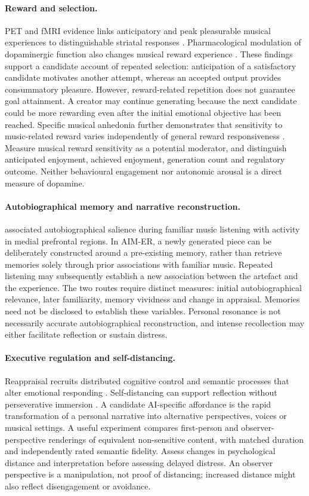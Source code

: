 \documentclass[11pt,a4paper]{article}
\begin{document}
\paragraph{Reward and selection.} PET and fMRI evidence links anticipatory and peak pleasurable musical experiences to distinguishable striatal responses \citep{salimpoor2011}. Pharmacological modulation of dopaminergic function also changes musical reward experience \citep{ferreri2019}. These findings support a candidate account of repeated selection: anticipation of a satisfactory candidate motivates another attempt, whereas an accepted output provides consummatory pleasure. However, reward-related repetition does not guarantee goal attainment. A creator may continue generating because the next candidate could be more rewarding even after the initial emotional objective has been reached. Specific musical anhedonia further demonstrates that sensitivity to music-related reward varies independently of general reward responsiveness \citep{mas2014}. Measure musical reward sensitivity as a potential moderator, and distinguish anticipated enjoyment, achieved enjoyment, generation count and regulatory outcome. Neither behavioural engagement nor autonomic arousal is a direct measure of dopamine.

\paragraph{Autobiographical memory and narrative reconstruction.} \citet{janata2009} associated autobiographical salience during familiar music listening with activity in medial prefrontal regions. In AIM-ER, a newly generated piece can be deliberately constructed around a pre-existing memory, rather than retrieve memories solely through prior associations with familiar music. Repeated listening may subsequently establish a new association between the artefact and the experience. The two routes require distinct measures: initial autobiographical relevance, later familiarity, memory vividness and change in appraisal. Memories need not be disclosed to establish these variables. Personal resonance is not necessarily accurate autobiographical reconstruction, and intense recollection may either facilitate reflection or sustain distress.

\paragraph{Executive regulation and self-distancing.} Reappraisal recruits distributed cognitive control and semantic processes that alter emotional responding \citep{ochsner2012}. Self-distancing can support reflection without perseverative immersion \citep{kross2011}. A candidate AI-specific affordance is the rapid transformation of a personal narrative into alternative perspectives, voices or musical settings. A useful experiment compares first-person and observer-perspective renderings of equivalent non-sensitive content, with matched duration and independently rated semantic fidelity. Assess changes in psychological distance and interpretation before assessing delayed distress. An observer perspective is a manipulation, not proof of distancing; increased distance might also reflect disengagement or avoidance.
\end{document}
